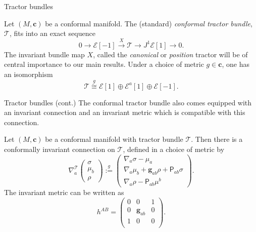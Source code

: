 \documentclass{beamer}
\newcommand{\confmet}{\bm{g}}
\begin{document}
\begin{frame}{Tractor bundles}
  \begin{definition}
    Let \( (M, \bm{c}) \) be a conformal manifold.
    The (standard) \emph{conformal tractor bundle}, \( \mathcal{T} \), fits into an exact sequence
    \pause
    \[
      0 \to \mathcal{E}[-1] \overset{X}{\to} \mathcal{T} \to J^1 \mathcal{E}[1] \to 0.
    \]
    \pause
    The invariant bundle map \( X \), called the \emph{canonical} or \emph{position} tractor will be of central importance to our main results.
    Under a choice of metric \( g \in \bm{c} \), one has an isomorphism 
    \[
      \mathcal{T} \overset{g}{\cong} \mathcal{E}[1] \oplus \mathcal{E}^a [1] \oplus \mathcal{E}[-1].
    \]
  \end{definition}

\end{frame}

\begin{frame}{Tractor bundles (cont.)}
  The conformal tractor bundle also comes equipped with an invariant connection and an invariant metric which is compatible with this connection.
  \pause
  \begin{Theorem}
    Let \( (M, \bm{c}) \) be a conformal manifold with tractor bundle \( \mathcal{T} \).
    Then there is a conformally invariant connection on \( \mathcal{T} \), defined in a choice of metric by
    \pause
    \[
      \nabla_a^{\mathcal{T}}
      \begin{pmatrix}
        \sigma \\ 
        \mu_b \\ 
        \rho
      \end{pmatrix}
      \overset{g}{:= }
      \begin{pmatrix}
        \nabla_a\sigma - \mu_a \\ 
        \nabla_a\mu_b + \confmet_{ab} \rho + \mathsf{P}_{ab} \sigma \\ 
        \nabla_a \rho - \mathsf{P}_{ab} \mu^b
      \end{pmatrix}.
    \]
    \pause
    The invariant metric can be written as 
    \[
      h^{AB} = 
      \begin{pmatrix}
      0 & 0 & 1 \\
      0 & \confmet_{ab} & 0\\
      1 & 0 & 0\\
      \end{pmatrix}.
    \]
  \end{Theorem}
\end{frame}
\end{document}
